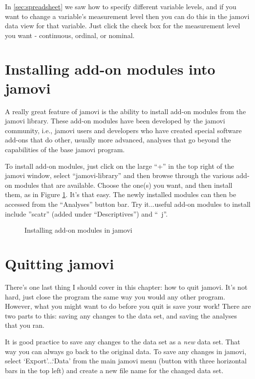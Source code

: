 In \ref{sec:spreadsheet} we saw how to specify different variable levels, and if you want to change a variable's measurement level then you can do this in the jamovi data view for that variable. Just click the check box for the measurement level you want - continuous, ordinal, or nominal. 


\section{Installing add-on modules into jamovi \label{sec:jamovimodules}}

A really great feature of jamovi is the ability to install add-on modules from the jamovi library. These add-on modules have been developed by the jamovi community, i.e., jamovi users and developers who have created special software add-ons that do other, usually more advanced, analyses that go beyond the capabilities of the base jamovi program. 

To install add-on modules, just click on the large \large{``+''} in the top right of the jamovi window, select ``jamovi-library'' and then browse through the various add-on modules that are available. Choose the one(s) you want, and then install them, as in Figure \ref{fig:modules}. It's that easy. The newly installed modules can then be accessed from the ``Analyses'' button bar. Try it...useful add-on modules to install include ''scatr'' (added under ``Descriptives'') and ``\R\ j''. 

\begin{figure}[htb]
\begin{center}
\caption{Installing add-on modules in jamovi}
\label{fig:modules}
\end{center}
\end{figure}


\section{Quitting jamovi \label{sec:quittingjamovi}}

There's one last thing I should cover in this chapter: how to quit jamovi. It's not hard, just close the program the same way you would any other program. However, what you might want to do before you quit is save your work! There are two parts to this: saving any changes to the data set, and saving the analyses that you ran.

It is good practice to save any changes to the data set as a {\it new} data set. That way you can always go back to the original data. To save any changes in jamovi, select `Export'...`Data' from the main jamovi menu (button with three horizontal bars in the top left) and create a new file name for the changed data set.

